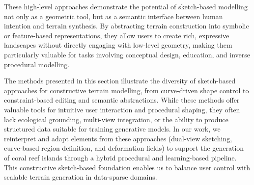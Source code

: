 
These high-level approaches demonstrate the potential of sketch-based modelling not only as a geometric tool, but as a semantic interface between human intention and terrain synthesis. By abstracting terrain construction into symbolic or feature-based representations, they allow users to create rich, expressive landscapes without directly engaging with low-level geometry, making them particularly valuable for tasks involving conceptual design, education, and inverse procedural modelling.

\midConclusion

The methods presented in this section illustrate the diversity of sketch-based approaches for constructive terrain modelling, from curve-driven shape control to constraint-based editing and semantic abstractions. While these methods offer valuable tools for intuitive user interaction and procedural shaping, they often lack ecological grounding, multi-view integration, or the ability to produce structured data suitable for training generative models. In our work, we reinterpret and adapt elements from these approaches (dual-view sketching, curve-based region definition, and deformation fields) to support the generation of coral reef islands through a hybrid procedural and learning-based pipeline. This constructive sketch-based foundation enables us to balance user control with scalable terrain generation in data-sparse domains.

